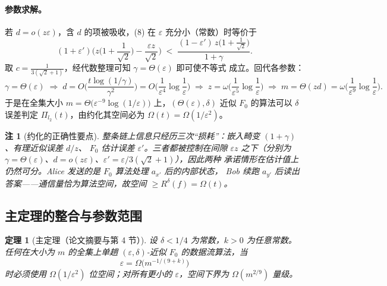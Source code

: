 \documentclass[UTF8, 11pt, a4paper, linestretch=1.15]{ctexart}
\theoremstyle{zhstyle}
\newtheorem{theorem}{定理}
\newtheorem{remark}{注}
\newcommand{\eps}{\varepsilon}
\newcommand{\Fzero}{F_0}
\begin{document}
	\paragraph{参数求解。}
	若 $d = o(z\eps)$，含 $d$ 的项被吸收，(8) 在 $\eps$ 充分小（常数）时等价于
	\[
	(1+\eps')\Big(z\Big(1+\frac{1}{\sqrt{2}}\Big) - \frac{\eps z}{\sqrt{2}}\Big)
	\;<\; \frac{(1-\eps')\,z\big(1+\frac{1}{\sqrt{2}}\big)}{1+\gamma}.
	\]
	取 $c = \frac{1}{3(\sqrt{2}+1)}$，经代数整理可知 $\gamma = \Theta(\eps)$ 即可使不等式
	成立。回代各参数：
	\[
	\gamma = \Theta(\eps)
	\;\Rightarrow\;
	d = O\Big(\frac{t\log(1/\gamma)}{\gamma^2}\Big) = O\Big(\frac{1}{\eps^4}\log\frac{1}{\eps}\Big)
	\;\Rightarrow\;
	z = \omega\Big(\frac{1}{\eps^5}\log\frac{1}{\eps}\Big)
	\;\Rightarrow\;
	m = \Theta(zd) = \omega\Big(\frac{1}{\eps^9}\log\frac{1}{\eps}\Big).
	\]
	于是在全集大小 $m = \Theta\big(\eps^{-9}\log(1/\eps)\big)$ 上，$(\Theta(\eps), \delta)$
	近似 $\Fzero$ 的算法可以 $\delta$ 误差判定 $\Pi_{l_2}(t)$，由约化其空间必为
	$\Omega(t) = \Omega(1/\eps^2)$。
	
	\begin{remark}[约化的正确性要点]
		整条链上信息只经历三次“损耗”：嵌入畸变 $(1+\gamma)$、有理近似误差 $d/z$、
		$\Fzero$ 估计误差 $\eps'$。三者都被控制在间隙 $\eps z$ 之下（分别为
		$\gamma = \Theta(\eps)$、$d = o(z\eps)$、$\eps' = \eps/3(\sqrt{2}+1)$），因此两种
		承诺情形在估计值上仍然可分。Alice 发送的是 $\Fzero$ 算法处理 $a_{x'}$ 后的内部状态，
		Bob 续跑 $a_{y'}$ 后读出答案——通信量恰为算法空间，故空间 $\geq R^{\delta}(f) =
		\Omega(t)$。
	\end{remark}
	
	\subsection{主定理的整合与参数范围}
	
	\begin{theorem}[主定理（论文摘要与第 4 节）]
		设 $\delta < 1/4$ 为常数，$k > 0$ 为任意常数。任何在大小为 $m$ 的全集上单趟
		$(\eps, \delta)$-近似 $\Fzero$ 的数据流算法，当
		\[
		\eps = \Omega\big(m^{-1/(9+k)}\big)
		\]
		时必须使用 $\Omega(1/\eps^2)$ 位空间；对所有更小的 $\eps$，空间下界为
		$\Omega(m^{2/9})$ 量级。
	\end{theorem}
	
\end{document}
